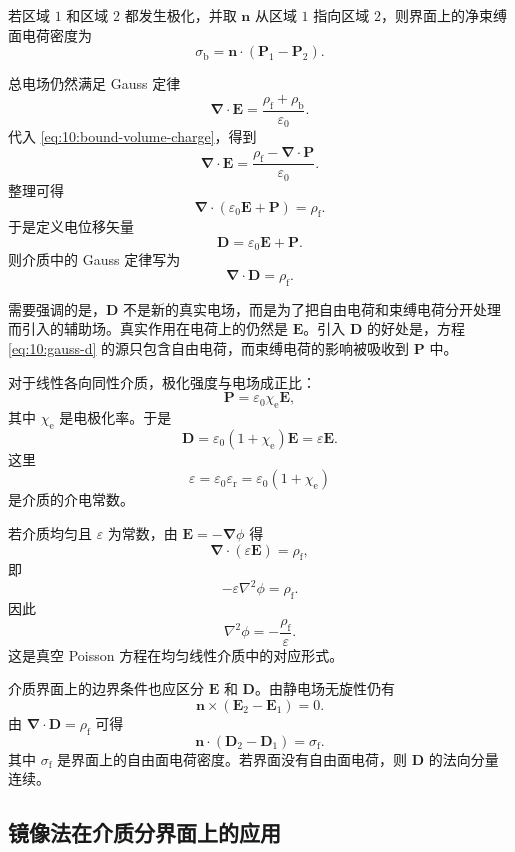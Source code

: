 若区域 $1$ 和区域 $2$ 都发生极化，并取 $\bm{n}$ 从区域 $1$ 指向区域 $2$，则界面上的净束缚面电荷密度为
\[
\sigma_{\mathrm{b}}
=
\bm{n}\cdot(\bm{P}_{1}-\bm{P}_{2}).
\]

总电场仍然满足 Gauss 定律
\[
\bm{\nabla}\cdot\bm{E}
=
\frac{\rho_{\mathrm{f}}+\rho_{\mathrm{b}}}{\varepsilon_{0}}.
\]
代入 \eqref{eq:10:bound-volume-charge}，得到
\[
\bm{\nabla}\cdot\bm{E}
=
\frac{\rho_{\mathrm{f}}-\bm{\nabla}\cdot\bm{P}}{\varepsilon_{0}}.
\]
整理可得
\[
\bm{\nabla}\cdot
(\varepsilon_{0}\bm{E}+\bm{P})
=
\rho_{\mathrm{f}}.
\]
于是定义电位移矢量
\begin{equation}
	\bm{D}
	=
	\varepsilon_{0}\bm{E}
	+
	\bm{P}.
	\label{eq:10:d-definition}
\end{equation}
则介质中的 Gauss 定律写为
\begin{equation}
	\bm{\nabla}\cdot\bm{D}
	=
	\rho_{\mathrm{f}}.
	\label{eq:10:gauss-d}
\end{equation}

需要强调的是，$\bm{D}$ 不是新的真实电场，而是为了把自由电荷和束缚电荷分开处理而引入的辅助场。真实作用在电荷上的仍然是 $\bm{E}$。引入 $\bm{D}$ 的好处是，方程 \eqref{eq:10:gauss-d} 的源只包含自由电荷，而束缚电荷的影响被吸收到 $\bm{P}$ 中。

对于线性各向同性介质，极化强度与电场成正比：
\[
\bm{P}
=
\varepsilon_{0}\chi_{\mathrm{e}}\bm{E},
\]
其中 $\chi_{\mathrm{e}}$ 是电极化率。于是
\[
\bm{D}
=
\varepsilon_{0}(1+\chi_{\mathrm{e}})\bm{E}
=
\varepsilon\bm{E}.
\]
这里
\[
\varepsilon
=
\varepsilon_{0}\varepsilon_{\mathrm{r}}
=
\varepsilon_{0}(1+\chi_{\mathrm{e}})
\]
是介质的介电常数。

若介质均匀且 $\varepsilon$ 为常数，由 $\bm{E}=-\bm{\nabla}\phi$ 得
\[
\bm{\nabla}\cdot(\varepsilon\bm{E})
=
\rho_{\mathrm{f}},
\]
即
\[
-\varepsilon\nabla^{2}\phi
=
\rho_{\mathrm{f}}.
\]
因此
\[
\nabla^{2}\phi
=
-\frac{\rho_{\mathrm{f}}}{\varepsilon}.
\]
这是真空 Poisson 方程在均匀线性介质中的对应形式。

介质界面上的边界条件也应区分 $\bm{E}$ 和 $\bm{D}$。由静电场无旋性仍有
\[
\bm{n}\times(\bm{E}_{2}-\bm{E}_{1})=0.
\]
由 $\bm{\nabla}\cdot\bm{D}=\rho_{\mathrm{f}}$ 可得
\[
\bm{n}\cdot(\bm{D}_{2}-\bm{D}_{1})
=
\sigma_{\mathrm{f}}.
\]
其中 $\sigma_{\mathrm{f}}$ 是界面上的自由面电荷密度。若界面没有自由面电荷，则 $\bm{D}$ 的法向分量连续。

\subsection{镜像法在介质分界面上的应用}

